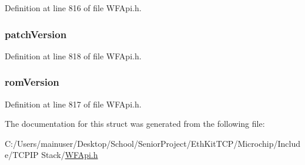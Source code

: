 Definition at line 816 of file W\+F\+Api.\+h.

\hypertarget{structt_w_f_device_info_struct_a772cbaf7608e498b809d9ee667bd5b36}{}
\subsubsection[{patch\+Version}]{ patch\+Version}\label{structt_w_f_device_info_struct_a772cbaf7608e498b809d9ee667bd5b36}


Definition at line 818 of file W\+F\+Api.\+h.

\hypertarget{structt_w_f_device_info_struct_a1758eb82a8eb37ccf844cf3f3470178d}{}
\subsubsection[{rom\+Version}]{ rom\+Version}\label{structt_w_f_device_info_struct_a1758eb82a8eb37ccf844cf3f3470178d}


Definition at line 817 of file W\+F\+Api.\+h.



The documentation for this struct was generated from the following file\+:\begin{DoxyCompactItemize}
\item 
C\+:/\+Users/mainuser/\+Desktop/\+School/\+Senior\+Project/\+Eth\+Kit\+T\+C\+P/\+Microchip/\+Include/\+T\+C\+P\+I\+P Stack/\hyperlink{_w_f_api_8h}{W\+F\+Api.\+h}\end{DoxyCompactItemize}
